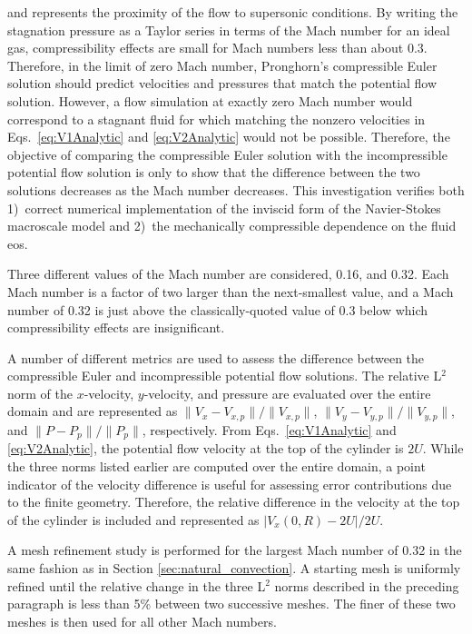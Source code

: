 \noindent and represents the proximity of the flow to supersonic conditions. By writing the stagnation pressure as a Taylor series in terms of the Mach number for an ideal gas, compressibility effects are small for Mach numbers less than about 0.3. Therefore, in the limit of zero Mach number, Pronghorn's compressible Euler solution should predict velocities and pressures that match the potential flow solution. However, a flow simulation at exactly zero Mach number would correspond to a stagnant fluid for which matching the nonzero velocities in Eqs.\ \eqref{eq:V1Analytic} and \eqref{eq:V2Analytic} would not be possible. Therefore, the objective of comparing the compressible Euler solution with the incompressible potential flow solution is only to show that the difference between the two solutions decreases as the Mach number decreases. This investigation verifies both 1)~correct numerical implementation of the inviscid form of the Navier-Stokes macroscale model and 2)~the mechanically compressible dependence on the fluid \gls{eos}.

Three different values of the Mach number are considered, 0.16, and 0.32. Each Mach number is a factor of two larger than the next-smallest value, and a Mach number of 0.32 is just above the classically-quoted value of 0.3 below which compressibility effects are insignificant.

A number of different metrics are used to assess the difference between the compressible Euler and incompressible potential flow solutions. The relative L$^2$ norm of the $x$-velocity, $y$-velocity, and pressure are evaluated over the entire domain and are represented as \(\|V_x-V_{x,p}\|/\|V_{x,p}\|\), \(\|V_y-V_{y,p}\|/\|V_{y,p}\|\), and \(\|P-P_p\|/\|P_p\|\), respectively. From Eqs.\ \eqref{eq:V1Analytic} and \eqref{eq:V2Analytic}, the potential flow velocity at the top of the cylinder is \(2U\). While the three norms listed earlier are computed over the entire domain, a point indicator of the velocity difference is useful for assessing error contributions due to the finite geometry. Therefore, the relative difference in the velocity at the top of the cylinder is included and represented as \(|V_x(0, R)-2U|/2U\).

A mesh refinement study is performed for the largest Mach number of 0.32 in the same fashion as in Section \ref{sec:natural_convection}. A starting mesh is uniformly refined until the relative change in the three L$^2$ norms described in the preceding paragraph is less than 5\% between two successive meshes. The finer of these two meshes is then used for all other Mach numbers.

